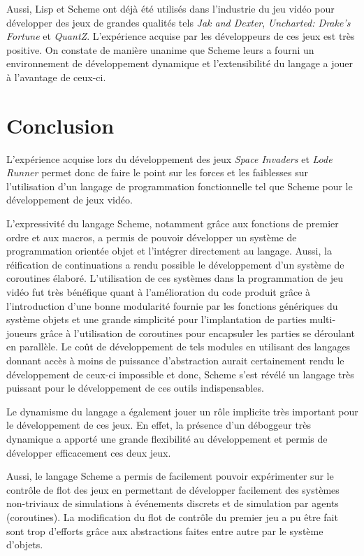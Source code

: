\documentclass[12pt,oneside,letterpaper,francais]{book}
\newcommand{\lr}{{\textit{Lode Runner }}}
\newcommand{\si}{{\textit{Space Invaders }}}
\begin{document}
Aussi, Lisp et Scheme ont déjà été utilisés dans l'industrie du jeu
vidéo pour développer des jeux de grandes qualités tels \textit{Jak
  and Dexter}, \textit{Uncharted: Drake's Fortune} et
\textit{QuantZ}. L'expérience acquise par les développeurs de ces jeux
est très positive. On constate de manière unanime que Scheme leurs a
fourni un environnement de développement dynamique et l'extensibilité
du langage a jouer à l'avantage de ceux-ci.



\chapter{Conclusion}


L'expérience acquise lors du développement des jeux \si et \lr permet
donc de faire le point sur les forces et les faiblesses sur
l'utilisation d'un langage de programmation fonctionnelle tel que
Scheme pour le développement de jeux vidéo.

L'expressivité du langage Scheme, notamment grâce aux fonctions de
premier ordre et aux macros, a permis de pouvoir développer un système
de programmation orientée objet et l'intégrer directement au
langage. Aussi, la réification de continuations a rendu possible le
développement d'un système de coroutines élaboré.  L'utilisation de
ces systèmes dans la programmation de jeu vidéo fut très bénéfique
quant à l'amélioration du code produit grâce à l'introduction d'une
bonne modularité fournie par les fonctions génériques du système
objets et une grande simplicité pour l'implantation de parties
multi-joueurs grâce à l'utilisation de coroutines pour encapsuler les
parties se déroulant en parallèle. Le coût de développement de tels
modules en utilisant des langages donnant accès à moins de puissance
d'abstraction aurait certainement rendu le développement de ceux-ci
impossible et donc, Scheme s'est révélé un langage très puissant pour
le développement de ces outils indispensables.

Le dynamisme du langage a également jouer un rôle implicite très
important pour le développement de ces jeux. En effet, la présence
d'un déboggeur très dynamique a apporté une grande flexibilité au
développement et permis de développer efficacement ces deux jeux.

Aussi, le langage Scheme a permis de facilement pouvoir expérimenter
sur le contrôle de flot des jeux en permettant de développer
facilement des systèmes non-triviaux de simulations à événements
discrets et de simulation par agents (coroutines). La modification du
flot de contrôle du premier jeu a pu être fait sont trop d'efforts
grâce aux abstractions faites entre autre par le système d'objets.
\end{document}
